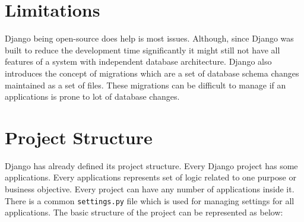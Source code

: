 \section{Limitations}
Django being open-source does help is most issues. Although, since Django was
built to reduce the development time significantly it might still not have
all features of a system with independent database architecture. Django also
introduces the concept of migrations which are a set of database schema changes
maintained as a set of files. These migrations can be difficult to manage if
an applications is prone to lot of database changes.

\section{Project Structure}
Django has already defined its project structure. Every Django project has some
applications. Every applications represents set of logic related to one purpose
or business objective. Every project can have any number of applications inside
it. There is a common \texttt{settings.py} file which is used for managing
settings for all applications. The basic structure of the project can be
represented as below:

